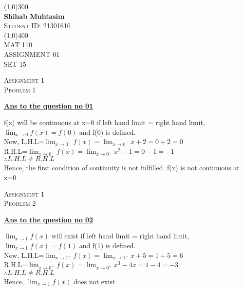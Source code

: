 \documentclass{article}
\begin{document}
 
    \begin{titlepage}
    \begin{center}
    \line(1,0){300}\\
    [0.25 in]
    \huge{\bfseries Shihab Muhtasim}\\
    [0.5 cm]
    \textsc{\Large Student ID: 21301610}\\
    \line(1,0){400}\\
    [2 cm]
    \textsc{\LARGE MAT 110}\\
    [0.5 cm]
    \textsc{\LARGE ASSIGNMENT 01}\\
    [0.5 cm]
    \textsc{\LARGE SET 15}\\
    \end{center}
    \end{titlepage}
\begin{newpage}
    \begin{flushright}
    \textsc{Assignment 1}\\
    \textsc{Problem 1}\\
    [1 cm]
    \end{flushright}
\begin{center}
  \textbf{\Large \underline {Ans to the question no 01}}\\
  [1 cm]
\end{center}
\Large {f(x) will be continuous at x=0 if left hand limit = right hand limit,$\lim_{x \to 0}f(x)=f(0)$ and f(0) is defined.\\[0.5cm]
Now, L.H.L=$\lim_{x \to 0^-}f(x)=\lim_{x \to 0^-}x+2=0+2=0$\\[3mm]
R.H.L=$\lim_{x \to 0^+}f(x)=\lim_{x \to 0^+}x^2-1=0-1=-1$\\[3mm]
$\therefore L.H.L \neq R.H.L$\\[3mm]
Hence, the first condition of continuity is not fulfilled. f(x) is not continuous at x=0 }
\end{newpage}
\begin{newpage}
    \begin{flushright}
    \textsc{Assignment 1}\\
    \textsc{Problem 2}\\
    [1 cm]
    \end{flushright}
\begin{center}
  \textbf{\Large \underline {Ans to the question no 02}}\\
  [1 cm]
\end{center}
\Large {$\lim_{x \to 1}f(x)$ will exist if left hand limit = right hand limit, $\lim_{x \to 1}f(x)=f(1)$ and f(1) is defined.\\[0.5cm]}
Now, L.H.L=$\lim_{x \to 1^-}f(x)=\lim_{x \to 1^-}x+5=1+5=6$\\[3mm]
R.H.L=$\lim_{x \to 0^+}f(x)=\lim_{x \to 0^+}x^3-4x=1-4=-3$\\[3mm]
$\therefore L.H.L \neq R.H.L$\\[3mm]
Hence, {$\lim_{x \to 1}f(x)$ does not exist }
\end{newpage}
\end{document}
